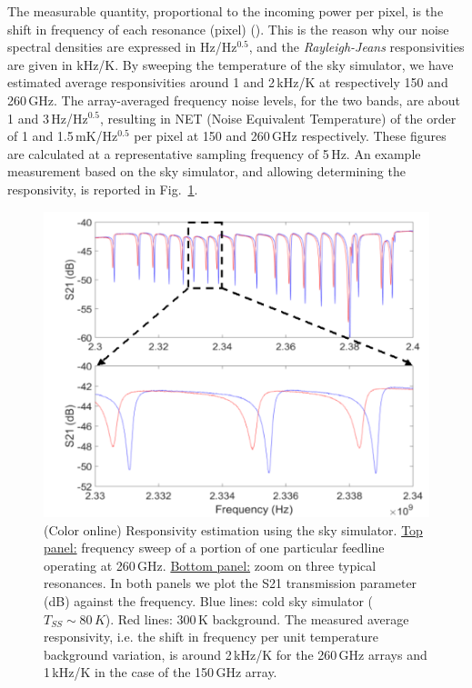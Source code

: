 \documentclass[]{aa} %
\begin{document}
The measurable quantity, proportional to the incoming power per pixel, is the shift in frequency of each resonance (pixel) (\cite{Swenson2010}). This is the reason why our noise spectral densities are expressed in Hz/Hz$^{0.5}$, and the \textit{Rayleigh-Jeans} responsivities are given in kHz/K. By sweeping the temperature of the sky simulator, we have estimated average responsivities around 1 and 2\,kHz/K at respectively 150 and 260\,GHz. The array-averaged frequency noise levels, for the two bands, are about 1 and 3\,Hz/Hz$^{0.5}$, resulting in NET (Noise Equivalent Temperature) of the order of 1 and 1.5\,mK/Hz$^{0.5}$ per pixel at 150 and 260\,GHz respectively. These figures are calculated at a representative sampling frequency of 5\,Hz. An example measurement based on the sky simulator, and allowing determining the responsivity, is reported in Fig.~\ref{Shift_f}. 

\begin{figure}[h]
\begin{center}
   \centering
    \includegraphics[width=1.0\linewidth]{260GHz-H_sky.png}
    \caption{(Color online) Responsivity estimation using the sky simulator. \underline{Top panel:} frequency sweep of a portion of one particular feedline operating at 260\,GHz. \underline{Bottom panel:} zoom on three typical resonances. In both panels we plot the S21 transmission parameter (dB) against the frequency. Blue lines: cold sky simulator ($T_{SS} \sim 80\,K$). Red lines: 300\,K background. The measured average responsivity, i.e. the shift in frequency per unit temperature background variation, is around 2\,kHz/K for the 260\,GHz arrays and 1\,kHz/K in the case of the 150\,GHz array.}
         \label{Shift_f}
\end{center}
\end{figure}
\end{document}
